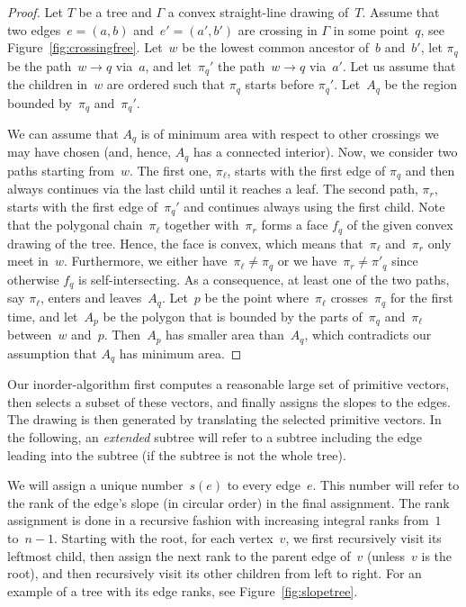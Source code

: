 \documentclass[a4paper,11pt]{article}
\theoremstyle{plain}
\begin{document}
\begin{proof}
  Let $T$ be a tree and $\Gamma$ a convex straight-line drawing
  of~$T$.  Assume that two edges~$e=(a,b)$ and~$e'=(a',b')$ are
  crossing in $\Gamma$ in some point~$q$, see
  Figure~\ref{fig:crossingfree}.  Let~$w$ be the lowest common ancestor
  of~$b$ and~$b'$, let $\pi_q$ be the path~$w\to q$ via~$a$,
  and let~$\pi_q'$ the path~$w\to q$ via~$a'$. Let us assume
  that the children in~$w$ are ordered such that $\pi_q$ starts before
  $\pi_q'$.  Let~$A_q$ be the region bounded by~$\pi_q$ and~$\pi_q'$.

  We can assume that $A_q$ is of minimum area with respect to other
  crossings we may have chosen (and, hence, $A_q$ has a connected
  interior).  Now, we consider two paths starting from~$w$. The first
  one, $\pi_\ell$, starts with the first edge of $\pi_q$ and then
  always continues via the last child until it reaches a leaf. The
  second path, $\pi_r$, starts with the first edge of~$\pi_q'$ and
  continues always using the first child.  Note that the polygonal
  chain~$\pi_\ell$ together with~$\pi_r$ forms a face $f_q$ of the
  given convex drawing of the tree.  Hence, the face is convex, which
  means that~$\pi_\ell$ and~$\pi_r$ only meet in~$w$.  Furthermore, we
  either have~$\pi_\ell\not=\pi_q$ or we have~$\pi_r\not=\pi'_q$ since
  otherwise $f_q$ is self-intersecting.  As a consequence, at least
  one of the two paths, say $\pi_\ell$, enters and leaves~$A_q$.
  Let~$p$ be the point where~$\pi_\ell$ crosses~$\pi_q$ for the first
  time, and let~$A_p$ be the polygon that is bounded by the parts
  of~$\pi_q$ and~$\pi_\ell$ between~$w$ and~$p$.  Then~$A_p$ has
  smaller area than~$A_q$, which contradicts our assumption that $A_q$
  has minimum area.
\end{proof}

Our inorder-algorithm first computes a reasonable large set of primitive 
vectors, then selects a subset of these vectors, and finally assigns the slopes 
to the edges. The drawing is then generated by translating the selected 
primitive vectors. In the following, an \emph{extended}
subtree will refer to a subtree including the edge leading into the subtree
(if the subtree is not the whole tree).  

We will assign a unique number~$s(e)$ to every edge~$e$.  This number will
refer to the rank of the edge's slope (in circular order) in the final
assignment.  The rank assignment is done in a recursive fashion with increasing integral ranks from~$1$ to~$n-1$. Starting with the root, for each vertex~$v$,
 we first recursively visit its leftmost child, then assign the next rank
 to the parent edge of~$v$ (unless~$v$ is the root), and then recursively visit
 its other children from left to right. For an example of a tree with its edge 
 ranks, see Figure~\ref{fig:slopetree}.
\end{document}
